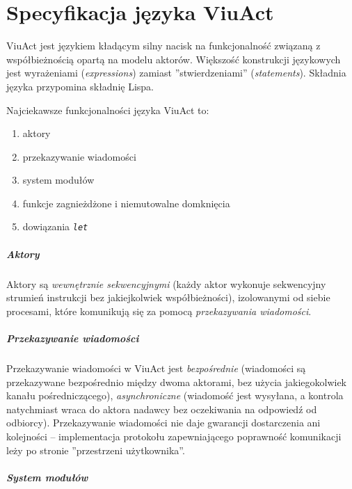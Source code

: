 \chapter{Specyfikacja języka ViuAct}
\label{viuact_spec}
\label{specyfikacja_jezyka_viuact}

ViuAct jest językiem kładącym silny nacisk na funkcjonalność związaną z współbieżnością opartą na modelu
aktorów. Większość konstrukcji językowych jest wyrażeniami (\emph{expressions}) zamiast ''stwierdzeniami''
(\emph{statements}). Składnia języka przypomina składnię Lispa.

Najciekawsze funkcjonalności języka ViuAct to:

\begin{enumerate}
    \item aktory
    \item przekazywanie wiadomości
    \item system modułów
    \item funkcje zagnieżdżone i niemutowalne domknięcia
    \item dowiązania \emph{\texttt{let}}
\end{enumerate}

\paragraph*{Aktory}

Aktory są \emph{wewnętrznie sekwencyjnymi} (każdy aktor wykonuje sekwencyjny strumień instrukcji bez
jakiejkolwiek współbieżności), izolowanymi od siebie procesami, które komunikują się za pomocą
\emph{przekazywania wiadomości}.

\paragraph*{Przekazywanie wiadomości}

Przekazywanie wiadomości w ViuAct jest \emph{bezpośrednie} (wiadomości są przekazywane bezpośrednio między
dwoma aktorami, bez użycia jakiegokolwiek kanału pośredniczącego), \emph{asynchroniczne} (wiadomość jest
wysyłana, a kontrola natychmiast wraca do aktora nadawcy bez oczekiwania na odpowiedź od odbiorcy).
Przekazywanie wiadomości nie daje gwarancji dostarczenia ani kolejności -- implementacja protokołu
zapewniającego poprawność komunikacji leży po stronie ''przestrzeni użytkownika''.

\paragraph*{System modułów}

